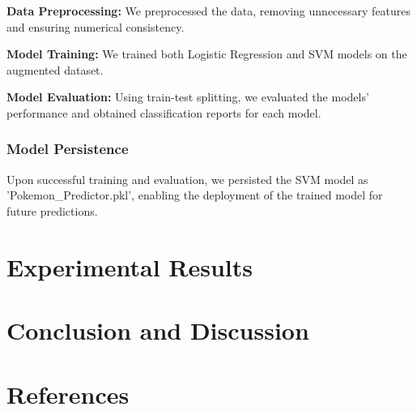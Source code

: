 \documentclass[11pt, letterpaper]{report}
\begin{document}
\textbf{Data Preprocessing:} We preprocessed the data, removing unnecessary features and ensuring numerical consistency.

\textbf{Model Training:} We trained both Logistic Regression and SVM models on the augmented dataset.

\textbf{Model Evaluation:} Using train-test splitting, we evaluated the models' performance and obtained classification reports for each model.

\subsection{Model Persistence}

Upon successful training and evaluation, we persisted the SVM model as 'Pokemon\_Predictor.pkl', enabling the deployment of the trained model for future predictions.
    

    \chapter{Experimental Results}
    \chapter{Conclusion and Discussion}
    \chapter{References}
\end{document}
